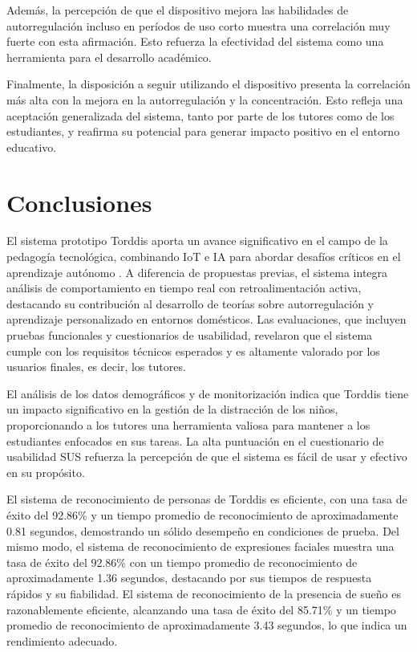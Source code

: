 \documentclass[a4paper,fleqn]{cas-sc}
\begin{document}
			Además, la percepción de que el dispositivo mejora las habilidades de autorregulación incluso en períodos de uso corto muestra una correlación muy fuerte con esta afirmación. Esto refuerza la efectividad del sistema como una herramienta para el desarrollo académico.
				
			Finalmente, la disposición a seguir utilizando el dispositivo presenta la correlación más alta con la mejora en la autorregulación y la concentración. Esto refleja una aceptación generalizada del sistema, tanto por parte de los tutores como de los estudiantes, y reafirma su potencial para generar impacto positivo en el entorno educativo.
				
		
	\section{Conclusiones}
	\label{seccion:Seis}
		El sistema prototipo Torddis aporta un avance significativo en el campo de la pedagogía tecnológica, combinando IoT e IA para abordar desafíos críticos en el aprendizaje autónomo \citep{DiPietro2025Meta}. A diferencia de propuestas previas, el sistema integra análisis de comportamiento en tiempo real con retroalimentación activa, destacando su contribución al desarrollo de teorías sobre autorregulación y aprendizaje personalizado en entornos domésticos. Las evaluaciones, que incluyen pruebas funcionales y cuestionarios de usabilidad, revelaron que el sistema cumple con los requisitos técnicos esperados y es altamente valorado por los usuarios finales, es decir, los tutores.
		
		El análisis de los datos demográficos y de monitorización indica que Torddis tiene un impacto significativo en la gestión de la distracción de los niños, proporcionando a los tutores una herramienta valiosa para mantener a los estudiantes enfocados en sus tareas. La alta puntuación en el cuestionario de usabilidad SUS refuerza la percepción de que el sistema es fácil de usar y efectivo en su propósito.
		
		El sistema de reconocimiento de personas de Torddis es eficiente, con una tasa de éxito del 92.86\% y un tiempo promedio de reconocimiento de aproximadamente 0.81 segundos, demostrando un sólido desempeño en condiciones de prueba. Del mismo modo, el sistema de reconocimiento de expresiones faciales muestra una tasa de éxito del 92.86\% con un tiempo promedio de reconocimiento de aproximadamente 1.36 segundos, destacando por sus tiempos de respuesta rápidos y su fiabilidad. El sistema de reconocimiento de la presencia de sueño es razonablemente eficiente, alcanzando una tasa de éxito del 85.71\% y un tiempo promedio de reconocimiento de aproximadamente 3.43 segundos, lo que indica un rendimiento adecuado.
		
\end{document}
